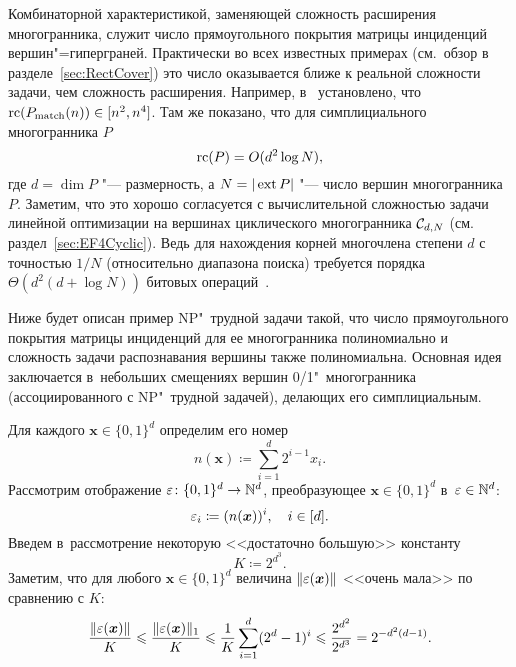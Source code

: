 Комбинаторной характеристикой, заменяющей сложность расширения многогранника, служит число прямоугольного покрытия матрицы инциденций вершин"=гиперграней.
Практически во всех известных примерах (см.~обзор в разделе~\ref{sec:RectCover}) это число оказывается ближе к реальной сложности задачи, чем сложность расширения.
Например, в~\cite{FioriniKPT:13} установлено, что $\operatorname{rc}(P_{\textup{match}}(n)) \in [n^2, n^4]$.
Там же показано, что для симплициального многогранника $P$
\begin{equation}
\label{eq:simpl}
\operatorname{rc}(P) = O(d^2 \log N),
\end{equation}
где $d = \dim P$ "--- размерность, а $N = |\operatorname{ext} P|$ "--- число вершин многогранника $P$.
Заметим, что это хорошо согласуется с вычислительной сложностью задачи линейной оптимизации на вершинах циклического многогранника ${\mathcal C}_{d,N}$ (см. раздел~\ref{sec:EF4Cyclic}). 
Ведь для нахождения корней многочлена степени $d$ с точностью $1/N$ (относительно диапазона поиска) требуется порядка $\Theta(d^2 (d + \log N))$ битовых операций~\cite{Pan:1996}.

Ниже будет описан пример NP"~трудной задачи такой,
что число прямоугольного покрытия матрицы инциденций для ее многогранника полиномиально и сложность задачи распознавания вершины также полиномиальна.
Основная идея заключается в~небольших смещениях вершин 0/1"~многогранника
(ассоциированного с NP"~трудной задачей), делающих его симплициальным.

% 
%


Для каждого $\bm{x}\in \{0, 1\}^d$ определим его номер %
\[
n(\bm{x}) \coloneqq \sum_{i=1}^d 2^{i-1} x_i. %
\]
Рассмотрим отображение $\varepsilon\colon \{0, 1\}^d \to \mathbb{N}^d$, преобразующее $\bm{x}\in \{0, 1\}^d$ в~$\varepsilon \in \mathbb{N}^d$:
\[
\varepsilon_i \coloneqq (n(\bm{x}))^i, \quad i\in[d].
\]
Введем в~рассмотрение некоторую <<достаточно большую>> константу
\[
K \coloneqq 2^{d^3}.
\]
Заметим, что для любого $\bm{x}\in \{0, 1\}^d$ величина $\|\varepsilon(\bm{x})\|$ <<очень мала>> по сравнению с $K$:
\begin{equation}
\frac{\|\varepsilon(\bm{x})\|}{K} \leqslant \frac{\|\varepsilon(\bm{x})\|_1}{K} \leqslant \frac{1}{K} \sum_{i=1}^d (2^d-1)^i \leqslant \frac{2^{d^2}}{2^{d^3}} 
= 2^{-d^2(d-1)}.
\label{eq:bigK}
\end{equation}

